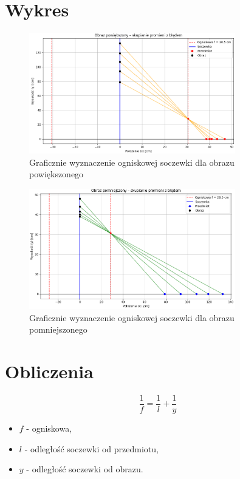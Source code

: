\documentclass[12pt]{article}
\begin{document}
\section*{Wykres}
\begin{figure}[H]
    \centering
    \includegraphics[width=0.8\textwidth]{obraz_pow.png}
    \caption{Graficznie wyznaczenie ogniskowej soczewki dla obrazu powiększonego}
    \label{fig:wykres1}
\end{figure}
\begin{figure}[H]
    \centering
    \includegraphics[width=0.8\textwidth]{obraz_pom.png}
    \caption{Graficznie wyznaczenie ogniskowej soczewki dla obrazu pomniejszonego}
    \label{fig:wykres2}
\end{figure}

\clearpage

\section*{Obliczenia}
\begin{equation}
    \frac{1}{f} = \frac{1}{l} + \frac{1}{y}
\end{equation}

\begin{itemize}
    \item $f$ - ogniskowa,
    \item $l$ - odległość soczewki od przedmiotu,
    \item $y$ - odległość soczewki od obrazu.
\end{itemize}
\end{document}
